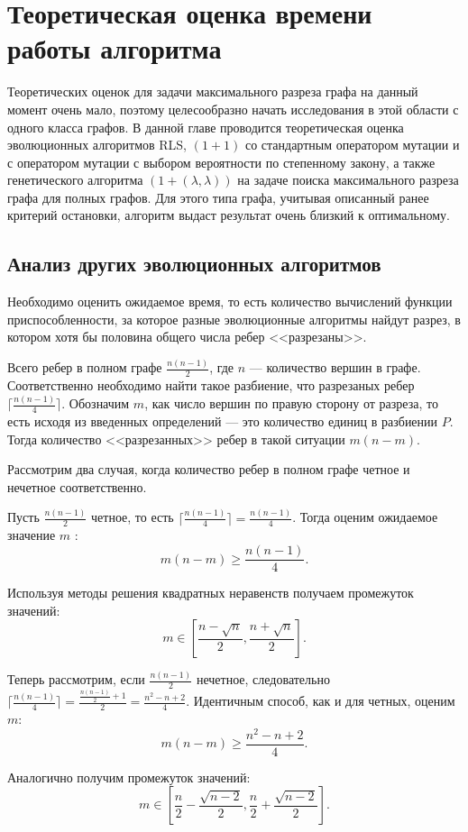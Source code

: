 \documentclass[times]{itmo-student-thesis}
\newcommand{\alglambda}{${(1 + (\lambda , \lambda))}$\xspace}
\begin{document}
\chapter{Теоретическая оценка времени работы алгоритма}
Теоретических оценок для задачи максимального разреза графа на данный момент очень мало, поэтому целесообразно начать исследования в этой области с одного класса графов.
В данной главе проводится теоретическая оценка эволюционных алгоритмов RLS, $(1 + 1)$ со стандартным оператором мутации и с оператором мутации с выбором вероятности по степенному закону, а также генетического алгоритма \alglambda на задаче поиска максимального разреза графа для полных графов.
Для этого типа графа, учитывая описанный ранее критерий остановки, алгоритм выдаст результат очень близкий к оптимальному.

\section{Анализ других эволюционных алгоритмов}
Необходимо оценить ожидаемое время, то есть количество вычислений функции приспособленности, за которое разные эволюционные алгоритмы найдут разрез, в котором хотя бы половина общего числа ребер <<разрезаны>>.

Всего ребер в полном графе $\frac{n(n-1)}{2}$, где $n$ --- количество вершин в графе.
Соответственно необходимо найти такое разбиение, что разрезаных ребер $\lceil \frac{n(n-1)}{4} \rceil$.
Обозначим $m$, как число вершин по правую сторону от разреза, то есть исходя из введенных определений --- это количество единиц в разбиении $P$.
Тогда количество <<разрезанных>> ребер в такой ситуации $m(n-m)$.

Рассмотрим два случая, когда количество ребер в полном графе четное и нечетное соответственно.

Пусть $\frac{n(n-1)}{2}$ четное, то есть $\lceil \frac{n(n-1)}{4} \rceil = \frac{n(n-1)}{4}$.
Тогда оценим ожидаемое значение $m$ :
$$
  m(n-m) \ge \frac{n(n-1)}{4}.
$$

Используя методы решения квадратных неравенств получаем промежуток значений:
$$
m \in \left[\frac{n - \sqrt{n}}{2}, \frac{n + \sqrt{n}}{2}\right].
$$

Теперь рассмотрим, если $\frac{n(n-1)}{2}$ нечетное, следовательно $\lceil \frac{n(n-1)}{4} \rceil = \frac{\frac{n(n-1)}{2}+1}{2} = \frac{n^2-n+2}{4}$.
Идентичным способ, как и для четных, оценим $m$:
$$
  m(n-m) \ge \frac{n^2-n+2}{4}.
$$

Аналогично получим промежуток значений:
$$
m \in \left[\frac{n}{2} -\frac{\sqrt{n-2}}{2},  \frac{n}{2} + \frac{\sqrt{n-2}}{2}\right].
$$
\end{document}
